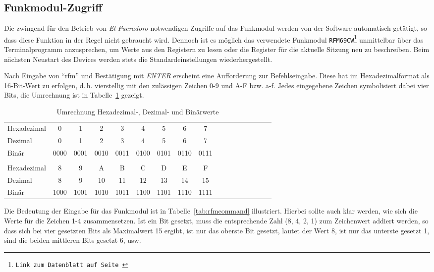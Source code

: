 \documentclass[pdftex, parskip, numbers=noenddot, toc=listof]{scrbook}
\newcommand{\anlage}{\emph{El Fueradoro}}
\begin{document}
	\subsection{Funkmodul-Zugriff}
	\label{sec:rfmzugriff}

	Die zwingend für den Betrieb von {\anlage} notwendigen Zugriffe auf das Funkmodul werden von der Software automatisch getätigt, so dass diese Funktion in der Regel nicht gebraucht wird. Dennoch ist es möglich das verwendete Funkmodul \texttt{RFM69CW\footnote{Link zum Datenblatt auf Seite~\pageref{sec:datasheets}}} unmittelbar über das Terminalprogramm anzusprechen, um Werte aus den Registern zu lesen oder die Register für die aktuelle Sitzung neu zu beschreiben. Beim nächsten Neustart des Devices werden stets die Standardeinstellungen wiederhergestellt.

	Nach Eingabe von \enquote{rfm} und Bestätigung mit \emph{ENTER} erscheint eine Aufforderung zur Befehls\-eingabe. Diese hat im Hexadezimalformat als 16-Bit-Wert zu erfolgen, d.\,h. vierstellig mit den zulässigen Zeichen 0-9 und A-F bzw. a-f. Jedes eingegebene Zeichen symbolisiert dabei vier Bits, die Umrechnung ist in Tabelle~\ref{tab:zahlensysteme} gezeigt.

	\begin{table}[t]
		\begin{center}
			\begin{tabularx}{.8\textwidth}{X*{16}c}
				\hline\hline
				Hexadezimal & 0    & 1    & 2    & 3    & 4    & 5    & 6    & 7    \\
				Dezimal     & 0    & 1    & 2    & 3    & 4    & 5    & 6    & 7    \\
				Binär      & 0000 & 0001 & 0010 & 0011 & 0100 & 0101 & 0110 & 0111 \\
				\\
				Hexadezimal & 8    & 9    & A    & B    & C    & D    & E    & F    \\
				Dezimal     & 8    & 9    & 10   & 11   & 12   & 13   & 14   & 15   \\
				Binär      & 1000 & 1001 & 1010 & 1011 & 1100 & 1101 & 1110 & 1111 \\ \hline\hline
			\end{tabularx}
		\end{center}
		\caption{Umrechnung Hexadezimal-, Dezimal- und Binärwerte}
		\label{tab:zahlensysteme}
	\end{table}

	Die Bedeutung der Eingabe für das Funkmodul ist in Tabelle~\ref{tab:rfmcommand} illustriert. Hierbei sollte auch klar werden, wie sich die Werte für die Zeichen 1-4 zusammensetzen. Ist ein Bit gesetzt, muss die entsprechende Zahl (8, 4, 2, 1) zum Zeichenwert addiert werden, so dass sich bei vier gesetzten Bits als Maximalwert 15 ergibt, ist nur das oberste Bit gesetzt, lautet der Wert 8, ist nur das unterste gesetzt 1, sind die beiden mittleren Bits gesetzt 6, usw.
\end{document}
